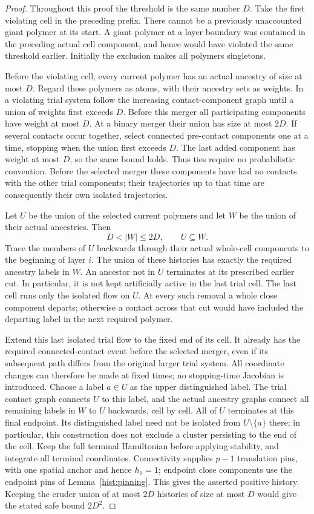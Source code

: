 \begin{proof}
Throughout this proof the threshold is the same number $D$.
Take the first violating cell in the preceding prefix. There
cannot be a previously unaccounted giant polymer at its start.
A giant polymer at a layer boundary was contained in the
preceding actual cell component, and hence would have violated
the same threshold earlier. Initially the exclusion makes all
polymers singletons.

Before the violating cell, every current polymer has an actual
ancestry of size at most $D$. Regard these polymers as atoms,
with their ancestry sets as weights. In a violating trial system
follow the increasing contact-component graph until a union of
weights first exceeds $D$. Before this merger all participating
components have weight at most $D$. At a binary merger their
union has size at most $2D$. If several contacts occur together,
select connected pre-contact components one at a time, stopping
when the union first exceeds $D$. The last added component has
weight at most $D$, so the same bound holds. Thus ties require
no probabilistic convention. Before the selected merger these
components have had no contacts with the other trial components;
their trajectories up to that time are consequently their own
isolated trajectories.

Let $U$ be the union of the selected current polymers and let
$W$ be the union of their actual ancestries. Then
\[
 D<|W|\leq2D,\qquad U\subseteq W.
\]
Trace the members of $U$ backwards through their actual
whole-cell components to the beginning of layer $i$. The union
of these histories has exactly the required ancestry labels in
$W$. An ancestor not in $U$ terminates at its prescribed earlier
cut. In particular, it is not kept artificially active in the
last trial cell. The last cell runs only the isolated flow on
$U$. At every such removal a whole close component departs;
otherwise a contact across that cut would have included the
departing label in the next required polymer.

Extend this last isolated trial flow to the fixed end of its
cell. It already has the required connected-contact event before
the selected merger, even if its subsequent path differs from
the original larger trial system. All coordinate changes can
therefore be made at fixed times; no stopping-time Jacobian is
introduced. Choose a label $a\in U$ as the upper distinguished
label. The trial contact graph connects $U$ to this label, and
the actual ancestry graphs connect all remaining labels in $W$
to $U$ backwards, cell by cell. All of $U$ terminates at this
final endpoint. Its distinguished label need not be isolated
from $U\setminus\{a\}$ there; in particular, this construction
does not exclude a cluster persisting to the end of the cell.
Keep the full terminal Hamiltonian before applying stability,
and integrate all terminal coordinates. Connectivity supplies
$p-1$ translation pins, with one spatial anchor and hence
$h_0=1$; endpoint close components use the endpoint pins of
Lemma~\ref{hist:pinning}. This gives the asserted positive
history. Keeping the cruder union of at most $2D$ histories of
size at most $D$ would give the stated safe bound $2D^2$.
\end{proof}


